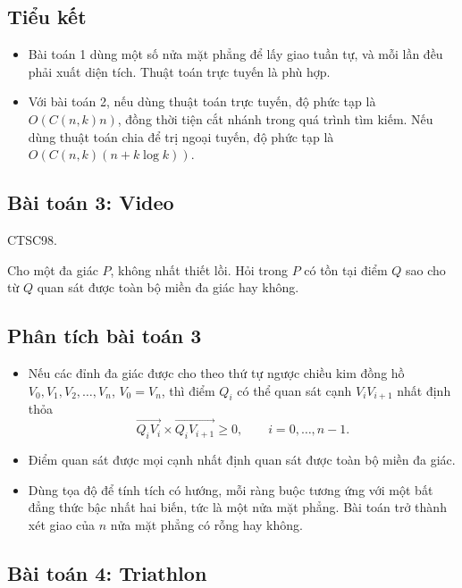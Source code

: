 \documentclass[11pt]{article}
\begin{document}
\subsection*{Tiểu kết}

\begin{itemize}
  \item Bài toán 1 dùng một số nửa mặt phẳng để lấy giao tuần tự, và mỗi lần
  đều phải xuất diện tích. Thuật toán trực tuyến là phù hợp.
  \item Với bài toán 2, nếu dùng thuật toán trực tuyến, độ phức tạp là
  \(O(C(n,k)n)\), đồng thời tiện cắt nhánh trong quá trình tìm kiếm. Nếu dùng
  thuật toán chia để trị ngoại tuyến, độ phức tạp là
  \(O(C(n,k)(n+k\log k))\).
\end{itemize}

\subsection*{Bài toán 3: Video}

CTSC98.

Cho một đa giác \(P\), không nhất thiết lồi. Hỏi trong \(P\) có tồn tại điểm
\(Q\) sao cho từ \(Q\) quan sát được toàn bộ miền đa giác hay không.

\subsection*{Phân tích bài toán 3}

\begin{itemize}
  \item Nếu các đỉnh đa giác được cho theo thứ tự ngược chiều kim đồng hồ
  \(V_0,V_1,V_2,\ldots,V_n\), \(V_0=V_n\), thì điểm \(Q_i\) có thể quan sát
  cạnh \(V_iV_{i+1}\) nhất định thỏa
  \[
    \overrightarrow{Q_iV_i}\times\overrightarrow{Q_iV_{i+1}}\ge 0,
    \qquad i=0,\ldots,n-1.
  \]
  \item Điểm quan sát được mọi cạnh nhất định quan sát được toàn bộ miền đa
  giác.
  \item Dùng tọa độ để tính tích có hướng, mỗi ràng buộc tương ứng với một
  bất đẳng thức bậc nhất hai biến, tức là một nửa mặt phẳng. Bài toán trở
  thành xét giao của \(n\) nửa mặt phẳng có rỗng hay không.
\end{itemize}

\subsection*{Bài toán 4: Triathlon}
\end{document}
